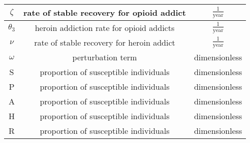 \documentclass[12pt]{article}
\begin{document}
\begin{center}
\begin{tabular}{|c | c | c | }
\hline

$\zeta$ &  rate of stable recovery for opioid addict & $\frac{1}{\text{year}}$  \\

\hline

$\theta_3$ &   heroin addiction rate for opioid addicts & $\frac{1}{\text{year}}$\\

\hline

$\nu$ &  rate of stable recovery for heroin addict & $\frac{1}{\text{year}}$  \\

\hline

$\omega$ & perturbation term & \small dimensionless \\

\hline
S & proportion of susceptible individuals & \small dimensionless \\

\hline

P & proportion of susceptible individuals & \small dimensionless \\

\hline
A & proportion of susceptible individuals & \small dimensionless \\

\hline
H & proportion of susceptible individuals & \small dimensionless \\

\hline
R & proportion of susceptible individuals & \small dimensionless \\
 \hline

\end{tabular}

\end{center}
 
\end{document}
